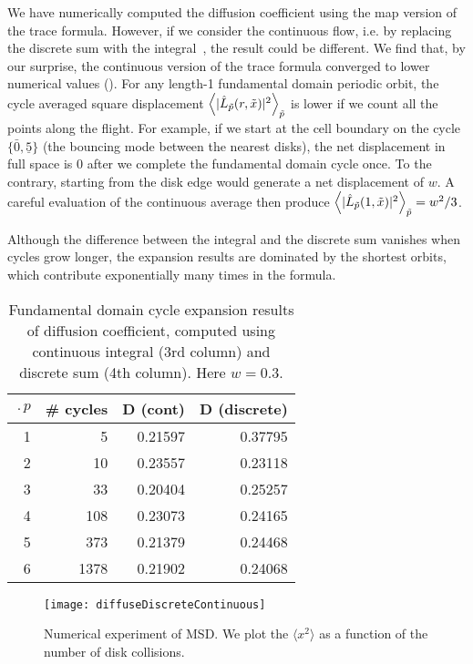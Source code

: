 We have numerically computed the diffusion coefficient using the map version of the trace formula. However, if we consider the continuous flow, i.e. by replacing the discrete sum with the integral~, the result could be different. We find that, by our surprise,  the continuous version of the trace formula converged to lower numerical values (). For any length-1 fundamental domain periodic orbit, the cycle averaged square displacement $\left\langle\vert\hat{L}_{{\tilde p}}(r,\tilde x)\vert^2\right\rangle_{{\tilde p}}$ is lower if we count all the points along the flight. For example, if we start at the cell boundary on the cycle $\{{\bar{0}, \underline{5}}\}$ (the bouncing mode between the nearest disks), the net displacement in full space is $0$ after we complete the fundamental domain cycle once. To the contrary, starting from the disk edge would generate a net displacement of $w$. A careful evaluation of the continuous average then produce $\left\langle\vert\hat{L}_{{\tilde p}}(1,\tilde x)\vert^2\right\rangle_{{\tilde p}} = w^2/3$.

Although the difference between the integral and the discrete sum vanishes when cycles grow longer, the expansion results are dominated by the shortest orbits, which contribute exponentially many times in the formula. 

\begin{table}[htbp]
	\centering
	\begin{tabular}{|r|r|r|r||}
		\hline
		$\period{p}$ & \# cycles & D (cont) & D (discrete) \\ 
		\hline\hline
		1      & 5      & 0.21597 & 0.37795 \\
		2      & 10     & 0.23557 & 0.23118 \\
		3      & 33     & 0.20404 & 0.25257 \\
		4      & 108    & 0.23073 & 0.24165 \\
		5      & 373    & 0.21379 & 0.24468 \\
		6      & 1378   & 0.21902 & 0.24068 \\ 
		\hline
	\end{tabular}
	\caption[Fundamental domain cycle expansion results of diffusion 
	coefficient]{\label{TCELL3}
		Fundamental domain cycle expansion results of diffusion 
		coefficient, computed using continuous integral (3rd column) and discrete sum (4th column). Here $w = 0.3$.
	}
\end{table}

\begin{figure}
\texttt{[image: diffuseDiscreteContinuous]}
\caption{Numerical experiment of MSD.  We plot the $\langle x^2\rangle$ as a function of the number of disk collisions. }
\end{figure}